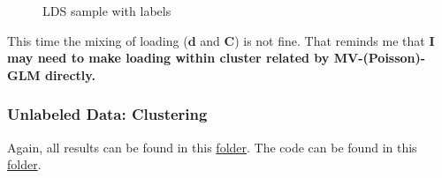 \documentclass[]{article}
\begin{document}
\begin{figure}[h!]
	\caption{LDS sample with labels}
	\label{fig:noA labeled}
\end{figure}

This time the mixing of loading (\(\mathbf{d}\) and \(\mathbf{C}\)) is not fine. That reminds me that \textbf{I may need to make loading within cluster related by MV-(Poisson)-GLM directly.}



\subsubsection{Unlabeled Data: Clustering}
Again, all results can be found in this \href{https://github.com/weigcdsb/state-space-clustering/tree/main/results/gif}{folder}. The code can be found in this \href{https://github.com/weigcdsb/state-space-clustering/tree/main/LDS/blkDiag}{folder}.
\end{document}
